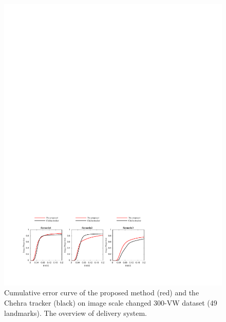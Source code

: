 \documentclass[a4paper, 10pt, conference]{ieeeconf}      %
\begin{document}
\begin{figure}[htbp]
        \centering  
        \includegraphics[width=\textwidth,height=0.3\textheight]{Figures_NMSE_img_proportion2.pdf}%
        \caption{
        Cumulative error curve of the proposed method (red) and the Chehra tracker (black) on image scale changed 300-VW dataset (49 landmarks).
        The overview of delivery system.
        }
        \label{fig:nmse3}  


\end{figure}
\end{document}
